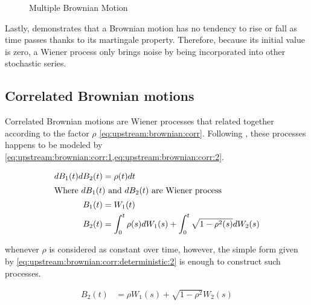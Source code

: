 \documentclass[a4paper, 12pt]{report}
\begin{document}
\begin{figure}[H]
\centering

\caption{Multiple Brownian Motion}
\label{fig:upstream:brownian}
\end{figure}

Lastly, \citet{shreve} demonstrates that a Brownian motion has no tendency to rise or fall as time passes thanks to its martingale property. Therefore, because its initial value is zero, a Wiener process only brings noise by being incorporated into other stochastic series.

\subsection{Correlated Brownian motions}
\label{sub:upstream:brownian:correlated}

Correlated Brownian motions are Wiener processes that related together according to the factor $\rho$ \ref{eq:upstream:brownian:corr}.
Following \citet{shreve}, these processes happens to be modeled by \cref{eq:upstream:brownian:corr:1,eq:upstream:brownian:corr:2}.

\begin{align}
  dB_1(t) dB_2(t) &= \rho(t) dt \label{eq:upstream:brownian:corr} \\
  \intertext{Where $dB_1(t)$ and $dB_2(t)$ are Wiener process }
  B_1(t) &= W_1(t) \label{eq:upstream:brownian:corr:1} \\
  B_2(t) &= \int_0^t \rho(s) dW_1(s) + \int_0^t \sqrt{1 - \rho^2(s)} dW_2(s) \label{eq:upstream:brownian:corr:2}
\end{align}

whenever $\rho$ is considered as constant over time, however, the simple form given by  \cref{eq:upstream:brownian:corr:deterministic:2} is enough to construct such processes.

\begin{align}
B_2(t) &= \rho W_1(s) + \sqrt{1 - \rho^2} W_2(s) \label{eq:upstream:brownian:corr:deterministic:2}
\end{align}
\end{document}

